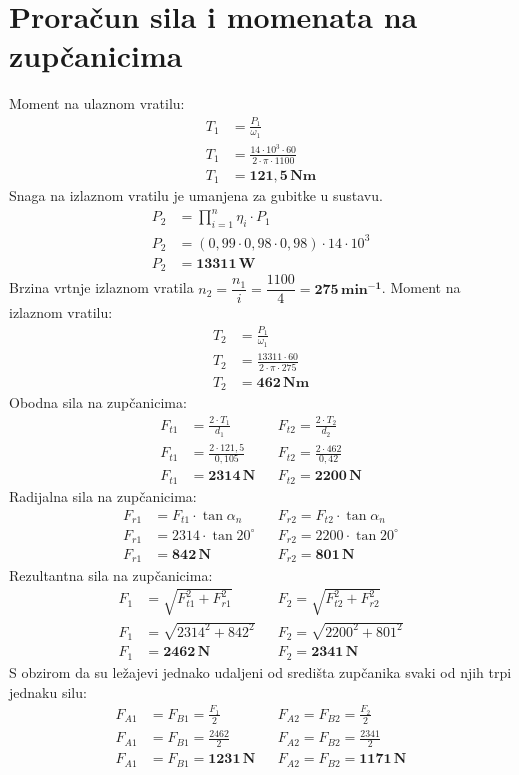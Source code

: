 \documentclass[11pt,a4paper,openright,twoside]{report}
\begin{document}
\section{Proračun sila i momenata na zupčanicima}
Moment na ulaznom vratilu:
\begin{align*}
T_1&=\frac{P_1}{\omega_1}\\
T_1&=\frac{14 \cdot 10^3 \cdot 60}{2 \cdot \pi \cdot 1100}\\
T_1&=\mathbf{121,5 \, Nm}
\end{align*}
Snaga na izlaznom vratilu je umanjena za gubitke u sustavu.
\begin{align*}
P_2&=\prod_{i=1}^{n} \eta_i \cdot P_1\\
P_2&=(0,99 \cdot 0,98 \cdot 0,98) \cdot 14\cdot10^3\\
P_2&=\mathbf{13311 \, W}
\end{align*}
Brzina vrtnje izlaznom vratila $n_2=\dfrac{n_1}{i}=\dfrac{1100}{4}=\mathbf{275 \, min^{-1}}$.
Moment na izlaznom vratilu:
\begin{align*}
T_2&=\frac{P_1}{\omega_1}\\
T_2&=\frac{13311 \cdot 60}{2 \cdot \pi \cdot 275}\\
T_2&=\mathbf{462 \, Nm}
\end{align*}
Obodna sila na zupčanicima:
\begin{align*}
F_{t1}&=\frac{2 \cdot T_1}{d_1} && F_{t2}=\frac{2 \cdot T_2}{d_2}\\
F_{t1}&=\frac{2 \cdot 121,5}{0,105} && F_{t2}=\frac{2 \cdot 462}{0,42}\\
F_{t1}&=\mathbf{2314 \, N} && F_{t2}=\mathbf{2200 \, N}
\end{align*}
Radijalna sila na zupčanicima:
\begin{align*}
F_{r1}&=F_{t1} \cdot \tan \alpha_n && F_{r2}=F_{t2} \cdot \tan \alpha_n \\
F_{r1}&=2314 \cdot \tan 20^{\circ} && F_{r2}=2200 \cdot \tan 20^{\circ} \\
F_{r1}&=\mathbf{842 \, N} && F_{r2}=\mathbf{801 \, N}
\end{align*}
Rezultantna sila na zupčanicima:
\begin{align*}
F_1&=\sqrt{F_{t1}^2+F_{r1}^2} && F_2=\sqrt{F_{t2}^2+F_{r2}^2}\\
F_1&=\sqrt{2314^2+842^2} && F_2=\sqrt{2200^2+801^2}\\
F_1&=\mathbf{2462 \, N} && F_2=\mathbf{2341 \, N}
\end{align*}
S obzirom da su ležajevi jednako udaljeni od središta zupčanika svaki od njih trpi jednaku silu:
\begin{align*}
F_{A1}&=F_{B1}=\frac{F_1}{2} && F_{A2}=F_{B2}=\frac{F_2}{2}\\
F_{A1}&=F_{B1}=\frac{2462}{2} && F_{A2}=F_{B2}=\frac{2341}{2}\\
F_{A1}&=F_{B1}=\mathbf{1231 \, N} && F_{A2}=F_{B2}=\mathbf{1171 \, N}
\end{align*}
\end{document}
